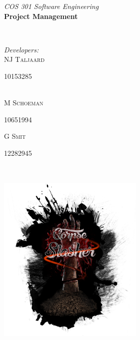 \documentclass[letterpaper]{article}
\makeatletter
\def\printauthor{%
    {\large \@author}}
\makeatother
\begin{document}
\begin{titlepage}
\begin{center}
\begin{minipage}{0.4\textwidth}
\begin{flushleft} \large
\emph{COS 301 Software Engineering}\\
\vspace{1cm}\textbf{Project Management}
\end{flushleft}
\end{minipage}
~
\begin{minipage}{0.4\textwidth}
	\begin{flushright} \large
	\emph{Developers:} \\
		NJ \textsc{Taljaard} \\
			\begin{small}
				10153285
			\end{small} \\
		M  \textsc{Schoeman} \\
			\begin{small}
				10651994 \\
			\end{small}
		G  \textsc{Smit} \\
			\begin{small}
				12282945
			\end{small}
	\end{flushright}
\end{minipage}\\



\includegraphics[width=70mm, height=90mm]{corpseslasher.png}\\ %
 

\end{center}
\end{titlepage}
\end{document}
